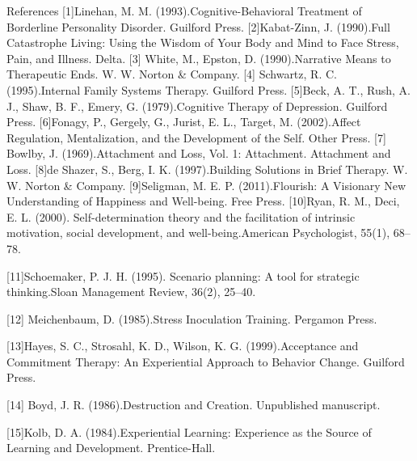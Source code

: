 References
[1]Linehan, M. M. (1993).Cognitive-Behavioral Treatment of Borderline Personality Disorder. Guilford
Press.
[2]Kabat-Zinn, J. (1990).Full Catastrophe Living: Using the Wisdom of Your Body and Mind to Face
Stress, Pain, and Illness. Delta.
[3] White, M., Epston, D. (1990).Narrative Means to Therapeutic Ends. W. W. Norton & Company.
[4] Schwartz, R. C. (1995).Internal Family Systems Therapy. Guilford Press.
[5]Beck, A. T., Rush, A. J., Shaw, B. F., Emery, G. (1979).Cognitive Therapy of Depression. Guilford
Press.
[6]Fonagy, P., Gergely, G., Jurist, E. L., Target, M. (2002).Affect Regulation, Mentalization, and the
Development of the Self. Other Press.
[7] Bowlby, J. (1969).Attachment and Loss, Vol. 1: Attachment. Attachment and Loss.
[8]de Shazer, S., Berg, I. K. (1997).Building Solutions in Brief Therapy. W. W. Norton & Company.
[9]Seligman, M. E. P. (2011).Flourish: A Visionary New Understanding of Happiness and Well-being.
Free Press.
[10]Ryan, R. M., Deci, E. L. (2000). Self-determination theory and the facilitation of intrinsic motivation,
social development, and well-being.American Psychologist, 55(1), 68–78.

[11]Schoemaker, P. J. H. (1995). Scenario planning: A tool for strategic thinking.Sloan Management
Review, 36(2), 25–40.

[12] Meichenbaum, D. (1985).Stress Inoculation Training. Pergamon Press.

[13]Hayes, S. C., Strosahl, K. D., Wilson, K. G. (1999).Acceptance and Commitment Therapy: An
Experiential Approach to Behavior Change. Guilford Press.

[14] Boyd, J. R. (1986).Destruction and Creation. Unpublished manuscript.

[15]Kolb, D. A. (1984).Experiential Learning: Experience as the Source of Learning and Development.
Prentice-Hall.
